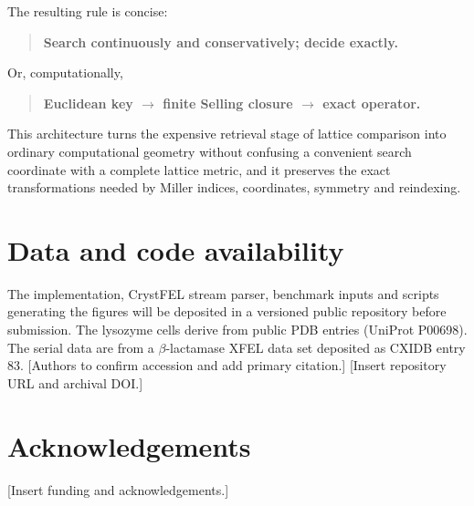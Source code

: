 \documentclass[11pt]{article}
\begin{document}
The resulting rule is concise:
\begin{quote}
\textbf{Search continuously and conservatively; decide exactly.}
\end{quote}
Or, computationally,
\begin{quote}
\textbf{Euclidean key $\rightarrow$ finite Selling closure $\rightarrow$ exact operator.}
\end{quote}
This architecture turns the expensive retrieval stage of lattice comparison into ordinary computational geometry without confusing a convenient search coordinate with a complete lattice metric, and it preserves the exact transformations needed by Miller indices, coordinates, symmetry and reindexing.

\section*{Data and code availability}
The implementation, CrystFEL stream parser, benchmark inputs and scripts generating the figures will be deposited in a versioned public repository before submission. The lysozyme cells derive from public PDB entries (UniProt P00698). The serial data are from a $\beta$-lactamase XFEL data set deposited as CXIDB entry 83. [Authors to confirm accession and add primary citation.] [Insert repository URL and archival DOI.]

\section*{Acknowledgements}
[Insert funding and acknowledgements.]
\end{document}
